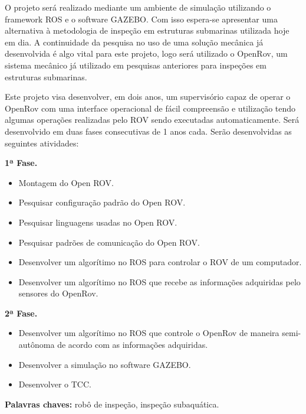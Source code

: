 O projeto será realizado mediante um ambiente de simulação utilizando o framework ROS e o software GAZEBO. Com isso espera-se apresentar uma alternativa à metodologia de inspeção em estruturas submarinas utilizada hoje em dia. A continuidade da pesquisa no uso de uma solução mecânica já desenvolvida é algo vital para este projeto, logo será utilizado o OpenRov, um sistema mecânico já utilizado em pesquisas anteriores para inspeções em estruturas submarinas.

Este projeto visa desenvolver, em dois anos, um supervisório capaz de operar o OpenRov  com uma interface operacional de fácil compreensão e utilização tendo algumas operações realizadas pelo ROV sendo executadas automaticamente. Será desenvolvido em duas fases consecutivas de 1 anos cada. Serão desenvolvidas as seguintes atividades:




 \textbf{\large 1ª Fase.}
 
\begin{itemize}

	\item Montagem do Open ROV.
	\item Pesquisar configuração padrão do Open ROV.
	\item Pesquisar linguagens usadas no Open ROV.
	\item Pesquisar padrões de comunicação do Open ROV.
	\item Desenvolver um algorítimo no ROS para controlar o ROV de um computador.
	\item Desenvolver um algorítimo no ROS que recebe as informações adquiridas pelo sensores do OpenRov.
\end{itemize}

 \textbf{\large 2ª Fase.}
 
\begin{itemize}

	\item Desenvolver um algorítimo no ROS que controle o OpenRov de maneira semi-autônoma de acordo com as informações adquiridas.
    \item Desenvolver a simulação no software GAZEBO.
	\item Desenvolver o TCC.

\end{itemize}


\vspace*{1cm}
\noindent \textbf{Palavras chaves: }robô de inspeção, inspeção subaquática.


